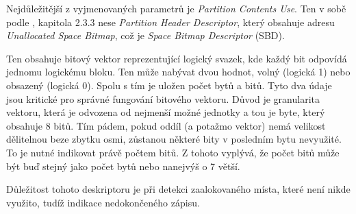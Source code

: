 Nejdůležitější z vyjmenovaných parametrů je \textit{Partition Contents Use}. Ten v sobě podle \cite{osta-udf-0201}, kapitola 2.3.3 nese \textit{Partition Header Descriptor}, který obsahuje adresu \textit{Unallocated Space Bitmap}, což je \textit{Space Bitmap Descriptor} (SBD).

Ten obsahuje bitový vektor reprezentující logický svazek, kde každý bit odpovídá jednomu logickému bloku. Ten může nabývat dvou hodnot, volný (logická 1) nebo obsazený (logická 0). Spolu s tím je uložen počet bytů a bitů. Tyto dva údaje jsou kritické pro správné fungování bitového vektoru. Důvod je granularita vektoru, která je odvozena od nejmenší možné jednotky a tou je byte, který obsahuje 8 bitů. Tím pádem, pokud oddíl (a potažmo vektor) nemá velikost dělitelnou beze zbytku osmi, zůstanou některé bity v posledním bytu nevyužité. To je nutné indikovat právě počtem bitů. Z tohoto vyplývá, že počet bitů může být buď stejný jako počet bytů nebo nanejvýš o 7 větší.

Důležitost tohoto deskriptoru je při detekci zaalokovaného místa, které není nikde využito, tudíž indikace nedokončeného zápisu.

